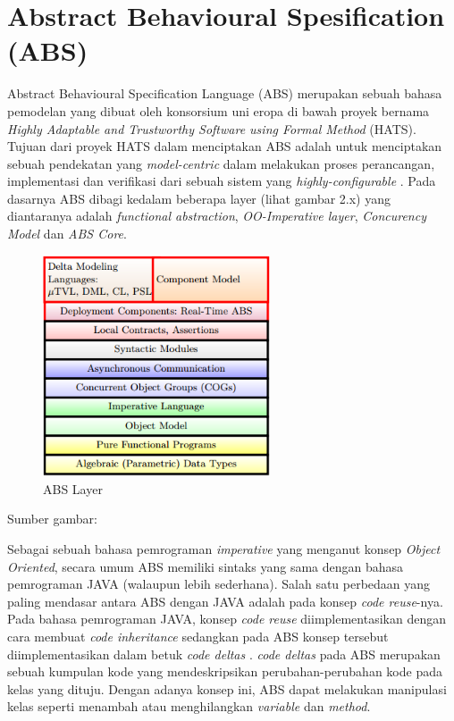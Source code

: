 \section{Abstract Behavioural Spesification (ABS)}
\noindent
Abstract Behavioural Specification Language (ABS) merupakan sebuah bahasa pemodelan yang dibuat oleh konsorsium uni eropa di bawah proyek bernama \textit{Highly Adaptable and Trustworthy Software using Formal Method} (HATS). Tujuan dari proyek HATS dalam menciptakan ABS adalah untuk menciptakan sebuah pendekatan yang \textit{model-centric} dalam melakukan proses perancangan, implementasi dan verifikasi dari sebuah sistem yang \textit{highly-configurable} \citep{clarke2012variability}. Pada dasarnya ABS dibagi kedalam beberapa layer (lihat gambar 2.x) yang diantaranya adalah \textit{functional abstraction}, \textit{OO-Imperative layer}, \textit{Concurency Model} dan \textit{ABS Core}. \\

\begin{figure}
    \centering
    \includegraphics[width=0.6\textwidth]
        {img/abs-layers.png}
    \caption{ABS Layer}
\end{figure}
\vspace{-0.8cm}
\begin{center}
{\small Sumber gambar: \citep{hahnle2013hats}}
\end{center}

\noindent
Sebagai sebuah bahasa pemrograman \textit{imperative} yang menganut konsep \textit{Object Oriented}, secara umum ABS memiliki sintaks yang sama dengan bahasa pemrograman JAVA (walaupun lebih sederhana). Salah satu perbedaan yang paling mendasar antara ABS dengan JAVA adalah pada konsep \textit{code reuse}-nya. Pada bahasa pemrograman JAVA, konsep \textit{code reuse} diimplementasikan dengan cara membuat \textit{code inheritance} sedangkan pada ABS konsep tersebut diimplementasikan dalam betuk \textit{code deltas} \citep{hahnle2013hats}. \textit{code deltas} pada ABS merupakan sebuah kumpulan kode yang mendeskripsikan perubahan-perubahan kode pada kelas yang dituju. Dengan adanya konsep ini, ABS dapat melakukan manipulasi kelas seperti menambah atau menghilangkan \textit{variable} dan \textit{method}. \\

